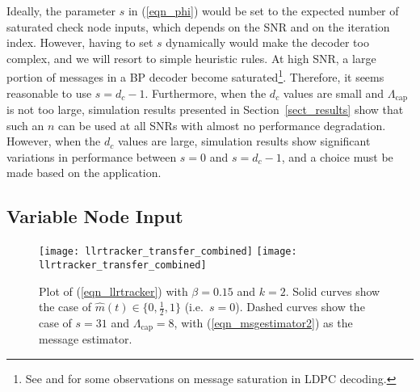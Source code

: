 \documentclass[12pt,journal,twoside,draftcls,onecolumn]{IEEEtran}
\begin{document}
	Ideally, the parameter $s$ in (\ref{eqn_phi}) would be set to the expected number of saturated check node inputs, which depends on the SNR and on the iteration index. However, having to set $s$ dynamically would make the decoder too complex, and we will resort to simple heuristic rules.
	At high SNR, a large portion of messages in a BP decoder become saturated\footnote{See \cite{varnica:2007} and \cite{schlegel:2010} for some observations on message saturation in LDPC decoding.}. Therefore, it seems reasonable to use $s = d_c-1$. Furthermore, when the $d_c$ values are small and $\Lambda_\mathrm{cap}$ is not too large, simulation results presented in Section~\ref{sect_results} show that such an $n$ can be used at all SNRs with almost no performance degradation. However, when the $d_c$ values are large, simulation results show significant variations in performance between $s=0$ and $s=d_c-1$, and a choice must be made based on the application.

	
	\subsection{Variable Node Input} \label{sect_implementation::llrtrackers}
	
	\begin{figure}[tbp]
	\begin{center}
\ifCLASSOPTIONdraftcls
	\texttt{[image: llrtracker\_transfer\_combined]}
\else
	\texttt{[image: llrtracker\_transfer\_combined]}
\fi
	\caption{Plot of (\ref{eqn_llrtracker}) with $\beta=0.15$ and $k=2$. Solid curves show the case of $\hat{m}(t) \in \{0, \frac{1}{2}, 1\}$ (i.e.~$s=0$). Dashed curves show the case of $s=31$ and $\Lambda_\mathrm{cap}=8$, with (\ref{eqn_msgestimator2}) as the message estimator.}
	\label{fig_llrtracker}
	\end{center}
	\end{figure}
	
\end{document}
